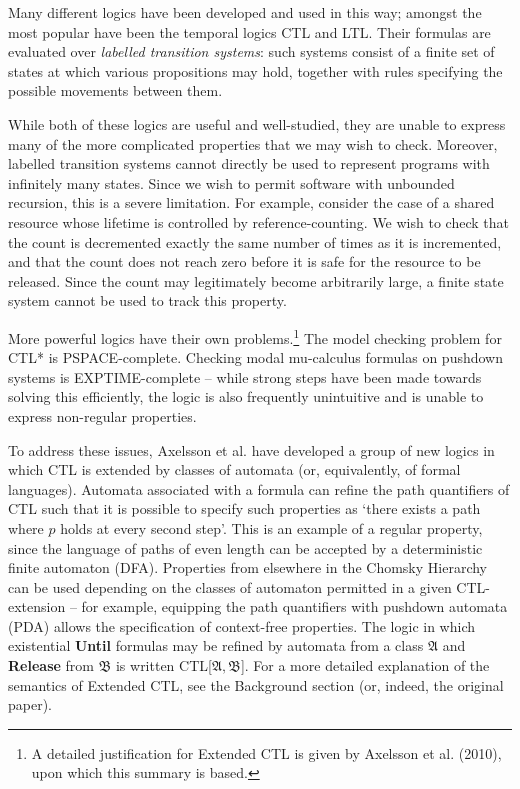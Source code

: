 \documentclass[11pt]{article}
\theoremstyle{definition}
\begin{document}
Many different logics have been developed and used in this way; amongst the
most popular have been the temporal logics CTL and LTL. Their formulas are
evaluated over \textit{labelled transition systems}: such systems consist of a
finite set of states at which various propositions may hold, together with
rules specifying the possible movements between them. %

While both of these logics are useful and well-studied, they are unable to
express many of the more complicated properties that we may wish to check.
Moreover, labelled transition systems cannot directly be used to represent
programs with infinitely many states. Since we wish to permit software with
unbounded recursion, this is a severe limitation. For example, consider the
case of a shared resource whose lifetime is controlled by reference-counting.
We wish to check that the count is decremented exactly the same number of times
as it is incremented, and that the count does not reach zero before it is safe
for the resource to be released. Since the count may legitimately become
arbitrarily large, a finite state system cannot be used to track this property.


More powerful logics have their own problems.\footnote{A detailed justification
for Extended CTL is given by Axelsson et al. (2010), upon which this summary is
based.} The model checking problem for CTL* is
PSPACE-complete\cite{Kreutzer10}\cite{sistla1985complexity}.  Checking modal
mu-calculus formulas on pushdown systems is
EXPTIME-complete\cite{walukiewicz1996pushdown} -- while strong steps have been
made towards solving this efficiently\cite{hague2010analysing}, the logic is
also frequently unintuitive and is unable to express non-regular properties.

To address these issues, Axelsson et al. have developed a group of new logics
in which CTL is extended by classes of automata (or, equivalently, of formal
languages).\cite{Kreutzer10} Automata associated with a formula can refine the path quantifiers
of CTL such that it is possible to specify such properties as `there exists a
path where $p$ holds at every second step'. This is an example of a regular
property, since the language of paths of even length can be accepted by a
deterministic finite automaton (DFA). Properties from elsewhere in the Chomsky
Hierarchy can be used depending on the classes of automaton permitted in a
given CTL-extension -- for example, equipping the path quantifiers with
pushdown automata (PDA) allows the specification of context-free properties.
The logic in which existential \textbf{Until} formulas may be refined by
automata from a class $\mathfrak{A}$ and \textbf{Release} from $\mathfrak{B}$ is
written CTL[$\mathfrak{A}, \mathfrak{B}$]. For a more detailed explanation of the
semantics of Extended CTL, see the Background section (or, indeed, the original
paper\cite{Kreutzer10}).
\end{document}
